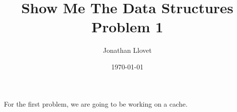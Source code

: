 \documentclass{article}
\title{Show Me The Data Structures\\Problem 1}
\author{Jonathan Llovet}
\date{\today}
\begin{document}
\maketitle

For the first problem, we are going to be working on a cache.
\textcite{DataStructuresAlgorithmsUdacityProblem1LRUCache}

\newpage
\printbibliography
\end{document}
